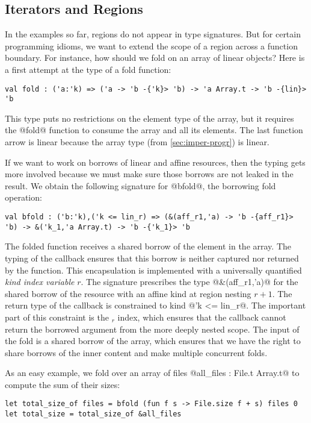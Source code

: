 

\subsection{Iterators and Regions}
\label{tuto:vector}

In the examples so far, regions do not appear in type signatures.
But for certain programming idioms, we want to extend the scope of a
region across a function boundary.
For instance, how should we fold on an array of linear objects?
Here is a first attempt at the type of a fold function:
\begin{lstlisting}[numbers=none]
val fold : ('a:'k) => ('a -> 'b -{'k}> 'b) -> 'a Array.t -> 'b -{lin}> 'b
\end{lstlisting}
This type puts no restrictions on the element type of the array, but
it requires the @fold@ function to consume the array and all its
elements. The last function arrow is linear because the array type (from
\cref{sec:imper-progr}) is linear. 

If we want to work on borrows of linear and affine resources, then the
typing gets more involved because
we must make sure those borrows are not leaked in the result.
We obtain the following signature for @bfold@, the borrowing fold operation:
\begin{lstlisting}[numbers=none]
val bfold : ('b:'k),('k <= lin_r) => (&(aff_r1,'a) -> 'b -{aff_r1}> 'b) -> &('k_1,'a Array.t) -> 'b -{'k_1}> 'b
\end{lstlisting}

The folded function receives a shared borrow of the element in the array.
The typing of the callback ensures
that this borrow is neither captured nor returned by the function.
%
This encapsulation is implemented with a universally quantified \emph{kind index variable} $r$.
The signature prescribes the type @&(aff_r1,'a)@ for the
shared borrow of the resource with an affine kind at region nesting $r+1$. The return
type of the callback is constrained to kind @'k <= lin_r@. The
important part of this constraint is the $_r$ index, which ensures
that the callback cannot return the borrowed argument from the more
deeply nested scope. 
%
The input of the fold is a shared borrow of the array,
which ensures that we have the right to share borrows of the inner content and
make multiple concurrent folds.

As an easy example, we fold over an array of files
@all_files : File.t Array.t@ to compute the sum of their sizes:
\begin{lstlisting}[numbers=none]
let total_size_of files = bfold (fun f s -> File.size f + s) files 0
let total_size = total_size_of &all_files
\end{lstlisting}

